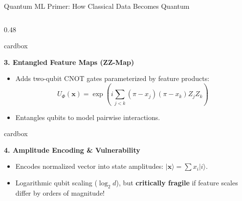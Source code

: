 \documentclass[aspectratio=169, 10pt]{beamer}
\newcommand{\cardbox}[3]{%
  \begin{beamercolorbox}[wd=\linewidth,rounded=true,sep=2.5pt]{cardbox}%
    {\bfseries\scriptsize\color{#1}#2\par}\vspace*{1pt}%
    {\footnotesize #3}%
  \end{beamercolorbox}%
}
\begin{document}
\begin{frame}{Quantum ML Primer: How Classical Data Becomes Quantum}
\begin{columns}[T]
    \begin{column}{0.48\textwidth}
      \cardbox{TealAccent}{3. Entangled Feature Maps (ZZ-Map)}{
        \begin{itemize}\setlength\itemsep{1pt}\scriptsize
          \item Adds two-qubit CNOT gates parameterized by feature products:
          \[
            U_{\Phi}(\mathbf{x}) = \exp\!\left(i \sum_{j < k} (\pi - x_j)(\pi - x_k) Z_j Z_k\right)
          \]
          \item Entangles qubits to model pairwise interactions.
        \end{itemize}
      }
      \vspace*{3pt}
      \cardbox{CoralRed}{4. Amplitude Encoding \& Vulnerability}{
        \begin{itemize}\setlength\itemsep{1pt}\scriptsize
          \item Encodes normalized vector into state amplitudes: $|\mathbf{x}\rangle = \sum x_i |i\rangle$.
          \item Logarithmic qubit scaling ($\log_2 d$), but \textbf{critically fragile} if feature scales differ by orders of magnitude!
        \end{itemize}
      }
    \end{column}
  \end{columns}
\end{frame}
\end{document}
